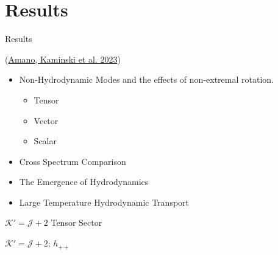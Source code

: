\documentclass[xcolor=dvipsnames]{beamer}
\begin{document}

\section{Results}

\begin{frame}{Results}

  (\href{https://arxiv.org/abs/2308.11686}{Amano, Kaminski et al. 2023})

  \begin{itemize}
    \item Non-Hydrodynamic Modes and the effects of non-extremal rotation.
      \begin{itemize}
        \item Tensor
        \item Vector
        \item Scalar
      \end{itemize}
    \item Cross Spectrum Comparison
    \item The Emergence of Hydrodynamics
    \item Large Temperature Hydrodynamic Transport
  \end{itemize}
\end{frame}

\begin{frame}{\(\mathcal K' = \mathcal J + 2\) Tensor Sector}
  \begin{center}
  \end{center}

  \(\mathcal K' = \mathcal J + 2\); \(h_{++}\)
\end{frame}
\end{document}
